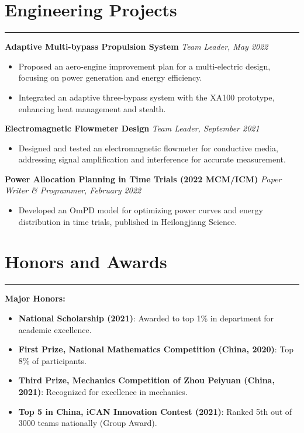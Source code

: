 \documentclass[10pt]{article} %
\begin{document}
\vspace{1mm}

\section*{Engineering Projects}
\hrule

\noindent \textbf{Adaptive Multi-bypass Propulsion System} \hfill \textit{Team Leader, May 2022}
\begin{itemize}[leftmargin=*,itemsep=1pt]
    \item Proposed an aero-engine improvement plan for a multi-electric design, focusing on power generation and energy efficiency.
    \item Integrated an adaptive three-bypass system with the XA100 prototype, enhancing heat management and stealth.
\end{itemize}

\noindent \textbf{Electromagnetic Flowmeter Design} \hfill \textit{Team Leader, September 2021}
\begin{itemize}[leftmargin=*,itemsep=1pt]
    \item Designed and tested an electromagnetic flowmeter for conductive media, addressing signal amplification and interference for accurate measurement.
\end{itemize}

\noindent \textbf{Power Allocation Planning in Time Trials (2022 MCM/ICM)} \hfill \textit{Paper Writer \& Programmer, February 2022}
\begin{itemize}[leftmargin=*,itemsep=1pt]
    \item Developed an OmPD model for optimizing power curves and energy distribution in time trials, published in Heilongjiang Science.
\end{itemize}

\section*{Honors and Awards}
\hrule

\vspace{3mm}

\noindent\textbf{Major Honors:}
\begin{itemize}[leftmargin=*,itemsep=1pt]
    \item \textbf{National Scholarship (2021)}: Awarded to top 1\% in department for academic excellence.
    \item \textbf{First Prize, National Mathematics Competition (China, 2020)}: Top 8\% of participants.
    \item \textbf{Third Prize, Mechanics Competition of Zhou Peiyuan (China, 2021)}: Recognized for excellence in mechanics.
    \item \textbf{Top 5 in China, iCAN Innovation Contest (2021)}: Ranked 5th out of 3000 teams nationally (Group Award).
\end{itemize}
\end{document}
